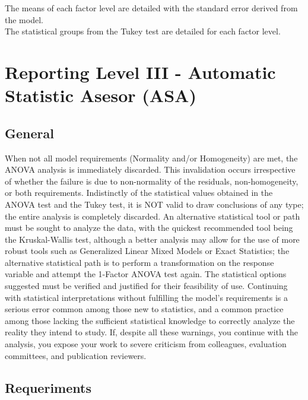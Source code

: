 \documentclass[
  letterpaper,
  DIV=11,
  numbers=noendperiod]{scrartcl}
\begin{document}
The means of each factor level are detailed with the standard error
derived from the model.\\
The statistical groups from the Tukey test are detailed for each factor
level.

\newpage

\section{Reporting Level III - Automatic Statistic Asesor
(ASA)}\label{reporting-level-iii---automatic-statistic-asesor-asa}

\subsection{General}\label{general}

When not all model requirements (Normality and/or Homogeneity) are met,
the ANOVA analysis is immediately discarded. This invalidation occurs
irrespective of whether the failure is due to non-normality of the
residuals, non-homogeneity, or both requirements. Indistinctly of the
statistical values obtained in the ANOVA test and the Tukey test, it is
NOT valid to draw conclusions of any type; the entire analysis is
completely discarded. An alternative statistical tool or path must be
sought to analyze the data, with the quickest recommended tool being the
Kruskal-Wallis test, although a better analysis may allow for the use of
more robust tools such as Generalized Linear Mixed Models or Exact
Statistics; the alternative statistical path is to perform a
transformation on the response variable and attempt the 1-Factor ANOVA
test again. The statistical options suggested must be verified and
justified for their feasibility of use. Continuing with statistical
interpretations without fulfilling the model's requirements is a serious
error common among those new to statistics, and a common practice among
those lacking the sufficient statistical knowledge to correctly analyze
the reality they intend to study. If, despite all these warnings, you
continue with the analysis, you expose your work to severe criticism
from colleagues, evaluation committees, and publication reviewers.

\subsection{Requeriments}\label{requeriments}
\end{document}
